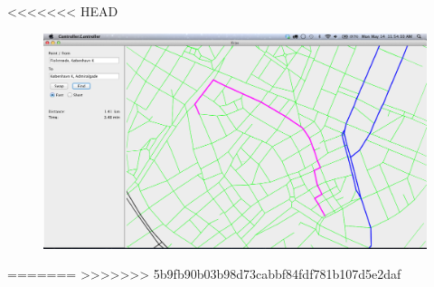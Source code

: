 <<<<<<< HEAD
\begin{figure}[htb]
\includegraphics{User_manual/screenshot.png}
\end{figure}
=======
>>>>>>> 5b9fb90b03b98d73cabbf84fdf781b107d5e2daf
